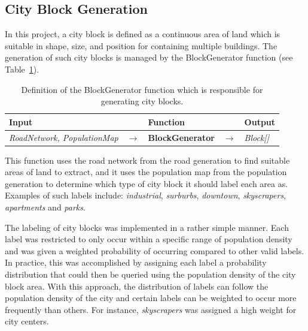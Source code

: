 \subsection{City Block Generation}

In this project, a city block is defined as a continuous area of land which is suitable in shape, size, and position for containing multiple buildings.
The generation of such city blocks is managed by the BlockGenerator function (see Table~\ref{table:blockgen}).

\begin{table}[H]
  \centering
  \begin{tabular}{lllll}
    \textbf{Input}                           &               & \textbf{Function}            &               & \textbf{Output}         \\
    \midrule
    \textit{RoadNetwork, PopulationMap}      & $\rightarrow$ & \textbf{BlockGenerator}      & $\rightarrow$ & \textit{Block[]}        \\
    \bottomrule
  \end{tabular}

  \caption{Definition of the BlockGenerator function which is responsible for generating city blocks.}
  \label{table:blockgen}
\end{table}
\vspace{-0.4cm} %

This function uses the road network from the road generation to find suitable areas of land to extract, and it uses the population map from the population generation to determine which type of city block it should label each area as.
Examples of such labels include: \textit{industrial}, \textit{surburbs}, \textit{downtown}, \textit{skyscrapers}, \textit{apartments} and \textit{parks}.

The labeling of city blocks was implemented in a rather simple manner.
Each label was restricted to only occur within a specific range of population density and was given a weighted probability of occurring compared to other valid labels.
In practice, this was accomplished by assigning each label a probability distribution that could then be queried using the population density of the city block area.
With this approach, the distribution of labels can follow the population density of the city and certain labels can be weighted to occur more frequently than others.
For instance, \textit{skyscrapers} was assigned a high weight for city centers.

